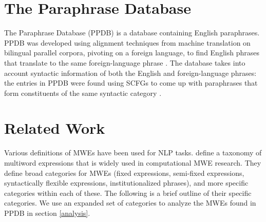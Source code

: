 \documentclass[11pt]{article}
\begin{document}
\section{The Paraphrase Database}

The Paraphrase Database (PPDB) is a database containing English paraphrases. PPDB was developed using alignment techniques from machine translation on bilingual parallel corpora, pivoting on a foreign language, to find English phrases that translate to the same foreign-language phrase \cite{bannard-callisonburch:2005:ACL}. The database takes into account syntactic information of both the English and foreign-language phrases: the entries in PPDB were found using SCFGs to come up with paraphrases that form constituents of the same syntactic category \cite{ganitkevitch-EtAl:2011:EMNLP,ganitkevitch-vandurme-callisonburch:2013:NAACL-HLT}.

\section{Related Work}

Various definitions of MWEs have been used for NLP tasks.  define a taxonomy of multiword expressions that is widely used in computational MWE research. They define broad categories for MWEs (fixed expressions, semi-fixed expressions, syntactically flexible expressions, institutionalized phrases), and more specific categories within each of these. The following is a brief outline of their specific categories.   We use an expanded set of categories to analyze the MWEs found in PPDB in section \ref{analysis}.
\end{document}
